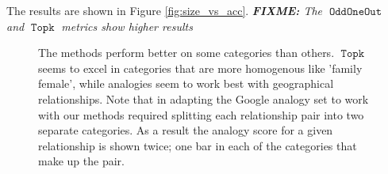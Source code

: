 \documentclass[11pt,a4paper]{article}
\DeclareMathOperator{\OddOneOut}{\texttt{OddOneOut}}
\DeclareMathOperator{\topk}{\texttt{Topk}}
\newcommand{\fixme}[1]{{\color{red}\itshape \textbf{FIXME:} {#1}}}
\begin{document}
The results are shown in Figure \ref{fig:size_vs_acc}.
\fixme{
The $\OddOneOut$ and $\topk$ metrics show higher results
}

\begin{figure}
\centering
\caption{
    The methods perform better on some categories than others. $\topk$  seems to excel in categories that are more homogenous like 'family female',
 while analogies seem to work best with geographical relationships.
  Note that in adapting the Google analogy set to work with our methods required splitting each relationship pair into two separate categories. 
  As a result the analogy score for a given relationship is shown twice;
   one bar in each of the categories that make up the pair.
   }
\label{fig:data_vs_methods}
\end{figure}
\end{document}
